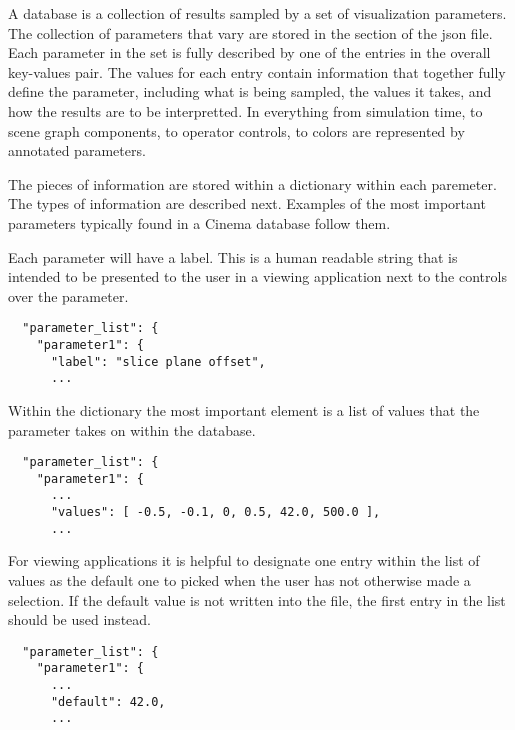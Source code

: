 \label{sec:PARAMETERS}

A \chaplin database is a collection of results sampled by a set of
visualization parameters. The collection of parameters that vary are
stored in the \parameterlist section of the json file.
Each parameter in the set is fully described by one of the
entries in the overall key-values pair. The values for each entry
contain information that together fully define the parameter,
including what is being sampled, the values it takes, and how the
results are to be interpretted. In \chaplin
everything from simulation time, to scene graph components, to operator
controls, to colors are represented by annotated parameters.

The pieces of information are stored within a dictionary within each paremeter.  The types of information are described
next. Examples of the most important parameters typically found in a
Cinema database follow them.


Each parameter will have a label. This is a human readable string that
is intended to be presented to the user in a viewing application next to the
controls over the parameter.

\begin{verbatim}
  "parameter_list": {
    "parameter1": {
      "label": "slice plane offset",
      ...
\end{verbatim}


Within the dictionary the most important element is a list of values
that the parameter takes on within the database.

\begin{verbatim}
  "parameter_list": {
    "parameter1": {
      ...
      "values": [ -0.5, -0.1, 0, 0.5, 42.0, 500.0 ],
      ...
\end{verbatim}


For viewing applications it is helpful to designate one entry within
the list of values as the default one to picked when the user has not
otherwise made a selection. If the default value is not written into
the file, the first entry in the list should be used instead.

\begin{verbatim}
  "parameter_list": {
    "parameter1": {
      ...
      "default": 42.0,
      ...
\end{verbatim}

